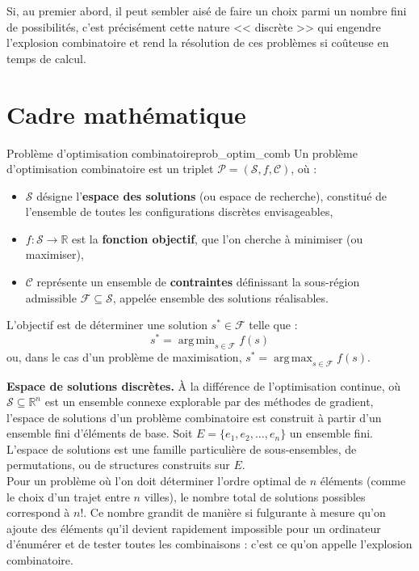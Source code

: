 \documentclass[12pt, a4paper, twoside, openright]{book}
\newcommand{\R}{\mathbb{R}}
\DeclareMathOperator*{\argmax}{arg\,max}
\DeclareMathOperator*{\argmin}{arg\,min}
\begin{document}
	Si, au premier abord, il peut sembler aisé de faire un choix parmi un nombre fini de possibilités, c'est précisément cette nature << discrète >> qui engendre l'explosion combinatoire et rend la résolution de ces problèmes si coûteuse en temps de calcul.
	
	\section{Cadre mathématique}
	\label{sec:cadre_math}
	
	\begin{definition}{Problème d'optimisation combinatoire}{prob_optim_comb}
		Un problème d'optimisation combinatoire est un triplet
		$\mathcal{P} = (\mathcal{S}, f, \mathcal{C})$, où :
		\begin{itemize}
			\item $\mathcal{S}$ désigne l'\textbf{espace des solutions}
			(ou espace de recherche), constitué de l'ensemble de toutes
			les configurations discrètes envisageables,
			\item $f : \mathcal{S} \rightarrow \R$ est la
			\textbf{fonction objectif}, que l'on cherche à minimiser
			(ou maximiser),
			\item $\mathcal{C}$ représente un ensemble de
			\textbf{contraintes} définissant la sous-région admissible
			$\mathcal{F} \subseteq \mathcal{S}$, appelée ensemble des
			solutions réalisables.
		\end{itemize}
	\end{definition}
	\newpage
	L'objectif est de déterminer une solution $s^* \in \mathcal{F}$ telle que :
	$$
	s^* = \argmin_{s \in \mathcal{F}} f(s)
	$$
	ou, dans le cas d'un problème de maximisation,
	$s^* = \argmax_{s \in \mathcal{F}} f(s)$.
	
	\textbf{Espace de solutions discrètes.}
	À la différence de l'optimisation continue, où $\mathcal{S} \subseteq \R^n$
	est un ensemble connexe explorable par des méthodes de gradient, l'espace
	de solutions d'un problème combinatoire est construit à partir d'un ensemble
	fini d'éléments de base. Soit $E = \{e_1, e_2, \ldots, e_n\}$ un ensemble
	fini. L'espace de solutions est une famille particulière de sous-ensembles,
	de permutations, ou de structures construits sur $E$. \\
	Pour un problème où l'on doit déterminer l'ordre optimal de $n$ éléments (comme le choix d'un trajet entre $n$ villes), le nombre total de solutions possibles correspond à $n!$. Ce nombre grandit de manière si fulgurante à mesure qu'on ajoute des éléments qu'il devient rapidement impossible pour un ordinateur d'énumérer et de tester toutes les combinaisons : c'est ce qu'on appelle l'explosion combinatoire. 	
	
\end{document}
